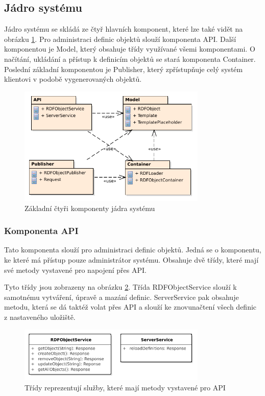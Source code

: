 \documentclass[thesis=B,czech]{FITthesis}[2012/06/26]
\begin{document}
  \subsection{Jádro systému}  
  Jádro systému se skládá ze čtyř hlavních komponent, které lze také vidět na obrázku \ref{packages_core}. Pro administraci definic objektů slouží komponenta API. Další komponentou je Model, který obsahuje
  třídy využívané všemi komponentami. O načítání, ukládání a přístup k definicím objektů se stará komponenta Container.
  Poslední základní komponentou je Publisher, který zpřístupňuje celý systém klientovi v podobě vygenerovaných objektů.
  
  
  \begin{figure}\centering
 	\includegraphics[width=0.8\textwidth]{Components.pdf}
 	\caption[Model komponent]{Základní čtyři komponenty jádra systému}\label{packages_core}
 \end{figure}
  
  \subsubsection{Komponenta API}
    Tato komponenta slouží pro administraci definic objektů. Jedná se o komponentu, ke které má přístup pouze administrátor systému. Obsahuje dvě třídy, které
    mají své metody vystavené pro napojení přes API.
    
    Tyto třídy jsou zobrazeny na obrázku \ref{api_class}. Třída RDFObjectService slouží k samotnému vytváření, úpravě a mazání definic. ServerService pak obsahuje
    metodu, která se dá taktéž volat přes API a slouží ke znovunačtení všech definic z nastaveného uložiště.
    \begin{figure}\centering
 	\includegraphics[width=0.8\textwidth]{API.pdf}
 	\caption[Model tříd API]{Třídy reprezentují služby, které mají metody vystavené pro API}\label{api_class}
    \end{figure}
    
\end{document}
